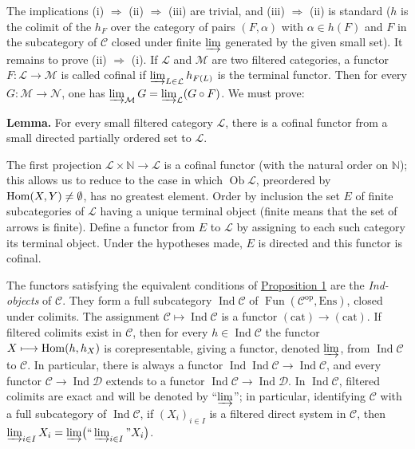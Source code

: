 The implications (i) $\Rightarrow$ (ii) $\Rightarrow$ (iii) are trivial, and (iii) $\Rightarrow$ (ii) is standard ($h$ is the colimit of the $h_F$ over the category of pairs $(F,\alpha)$ with $\alpha\in h(F)$ and $F$ in the subcategory of $\mathcal C$ closed under finite $\varinjlim$ generated by the given small set). It remains to prove (ii) $\Rightarrow$ (i). If $\mathcal L$ and $\mathcal M$ are two filtered categories, a functor $F:\mathcal L\to\mathcal M$ is called cofinal if $\varinjlim_{L\in\mathcal L}h_{F(L)}$ is the terminal functor. Then for every $G:\mathcal M\to\mathcal N$, one has $\varinjlim_{\mathcal M}G=\varinjlim_{\mathcal L}(G\circ F)$. We must prove:

\par\medskip\noindent\textbf{Lemma.} For every small filtered category $\mathcal L$, there is a cofinal functor from a small directed partially ordered set to $\mathcal L$.

The first projection $\mathcal L\times\mathbb N\longrightarrow\mathcal L$ is a cofinal functor (with the natural order on $\mathbb N$); this allows us to reduce to the case in which $\operatorname{Ob}\mathcal L$, preordered by $\operatorname{Hom}(X,Y)\ne\emptyset$, has no greatest element. Order by inclusion the set $E$ of finite subcategories of $\mathcal L$ having a unique terminal object (finite means that the set of arrows is finite). Define a functor from $E$ to $\mathcal L$ by assigning to each such category its terminal object. Under the hypotheses made, $E$ is directed and this functor is cofinal.

The functors satisfying the equivalent conditions of \hyperref[appen:prop1]{Proposition 1} are the \emph{Ind-objects} of $\mathcal C$. They form a full subcategory $\operatorname{Ind}\mathcal C$ of $\operatorname{Fun}(\mathcal C^{\mathrm{op}},\mathrm{Ens})$, closed under colimits. The assignment $\mathcal C\longmapsto\operatorname{Ind}\mathcal C$ is a functor $(\text{cat})\to(\text{cat})$. If filtered colimits exist in $\mathcal C$, then for every $h\in\operatorname{Ind}\mathcal C$ the functor $X\longmapsto\operatorname{Hom}(h,h_X)$ is corepresentable, giving a functor, denoted $\varinjlim$, from $\operatorname{Ind}\mathcal C$ to $\mathcal C$. In particular, there is always a functor $\operatorname{Ind}\operatorname{Ind}\mathcal C\longrightarrow\operatorname{Ind}\mathcal C$, and every functor $\mathcal C\longrightarrow\operatorname{Ind}\mathcal D$ extends to a functor $\operatorname{Ind}\mathcal C\longrightarrow\operatorname{Ind}\mathcal D$. In $\operatorname{Ind}\mathcal C$, filtered colimits are exact and will be denoted by ``$\varinjlim$''; in particular, identifying $\mathcal C$ with a full subcategory of $\operatorname{Ind}\mathcal C$, if $(X_i)_{i\in I}$ is a filtered direct system in $\mathcal C$, then $\varinjlim_{i\in I}X_i=\varinjlim\bigl(\text{``}\varinjlim_{i\in I}\text{''}X_i\bigr)$.

